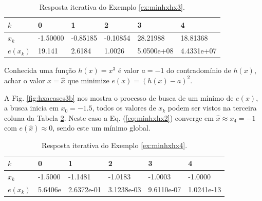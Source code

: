 \begin{table}[!h]
\centering
\begin{tabular}{|l|l|l|l|l|l|}
\hline
$k$      & 0 & 1 & 2 & 3 & 4 \\ \hline
$x_k$    & -1.50000 & -0.85185 & -0.10854 & 28.21988 & 18.81368 \\ \hline
$e(x_k)$ & 19.141 & 2.6184 & 1.0026 & 5.0500e+08 & 4.4331e+07 \\ \hline
\end{tabular}
\caption{Resposta iterativa do Exemplo \ref{ex:minhxhx3}.}
\label{tab:hxacases3}
\end{table}


\begin{example}\label{ex:minhxhx4}
Conhecida uma função $h(x)=x^3$ é valor $a=-1$ do contradomínio de $h(x)$,
achar o valor $x=\hat{x}$ que minimize $e(x)=(h(x)-a)^2$.
\end{example}
\begin{SolutionT}\label{sol:minhxhx4}
A Fig. \ref{fig:hxacases3b} nos mostra o processo de busca de um mínimo
 de $e(x)$, a busca inicia em $x_0=-1.5$,
 todos os valores de $x_{k}$ podem ser vistos na terceira coluna da
Tabela \ref{tab:hxacases4}. Neste caso a Eq. (\ref{eq:minhxhx2}) converge
em $\hat{x}\approx x_4 =-1$ com $e(\hat{x})\approx 0$, sendo este um mínimo global.
\end{SolutionT}

\begin{table}[!h]
\centering
\begin{tabular}{|l|l|l|l|l|l|}
\hline
$k$      & 0 & 1 & 2 & 3 & 4 \\ \hline
$x_k$    & -1.5000 & -1.1481 & -1.0183 & -1.0003 & -1.0000 \\ \hline
$e(x_k)$ & 5.6406e & 2.6372e-01 & 3.1238e-03 & 9.6110e-07 & 1.0241e-13 \\ \hline
\end{tabular}
\caption{Resposta iterativa do Exemplo \ref{ex:minhxhx4}.}
\label{tab:hxacases4}
\end{table}


